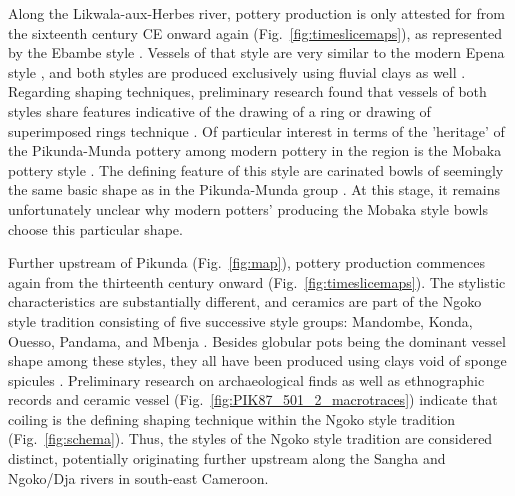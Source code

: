 \documentclass[smallextended,natbib]{svjour3}       %
\begin{document}
Along the Likwala-aux-Herbes river, pottery production is only attested for from the sixteenth century CE onward again (Fig.~\ref{fig:timeslicemaps}), as represented by the Ebambe style \citep[Fig.~\ref{fig:sangahtypes}.22--23;][131--136]{Seidensticker.2021e}. Vessels of that style are very similar to the modern Epena style \citep[Fig.~\ref{fig:sangahtypes}.25--26;][137--141]{Seidensticker.2021e}, and both styles are produced exclusively using fluvial clays as well \citep{Seidensticker.2020}. Regarding shaping techniques, preliminary research found that vessels of both styles share features indicative of the drawing of a ring or drawing of superimposed rings technique \citep[Fig.~\ref{fig:schema};][55--57 Fig.~17--18]{Seidensticker.2021e}. Of particular interest in terms of the 'heritage' of the Pikunda-Munda pottery among modern pottery in the region is the Mobaka pottery style \citep[141--144]{Seidensticker.2021e}. The defining feature of this style are carinated bowls of seemingly the same basic shape as in the Pikunda-Munda group \citep[Fig.~\ref{fig:sangahtypes}.24;][142 Fig.~63.1,64]{Seidensticker.2021e}. At this stage, it remains unfortunately unclear why modern potters' producing the Mobaka style bowls choose this particular shape.

Further upstream of Pikunda (Fig.~\ref{fig:map}), pottery production commences again from the thirteenth century onward (Fig.~\ref{fig:timeslicemaps}). The stylistic characteristics are substantially different, and ceramics are part of the Ngoko style tradition consisting of five successive style groups: Mandombe, Konda, Ouesso, Pandama, and Mbenja \citep[Fig.~\ref{fig:sangahtypes}.13--21;][145--162]{Seidensticker.2021e}. Besides globular pots being the dominant vessel shape among these styles, they all have been produced using clays void of sponge spicules \citep[Fig.~\ref{fig:thinsections}.J--K;][]{Seidensticker.2020}. Preliminary research on archaeological finds \citep[Fig.~\ref{fig:PIK87_1-2_3_macrotraces}--\ref{fig:PIK87_1_macrotraces};][53--54 Fig.~16B]{Seidensticker.2021e} as well as ethnographic records and ceramic vessel (Fig.~\ref{fig:PIK87_501_2_macrotraces}) indicate that coiling is the defining shaping technique within the Ngoko style tradition (Fig.~\ref{fig:schema}). Thus, the styles of the Ngoko style tradition are considered distinct, potentially originating further upstream along the Sangha and Ngoko/Dja rivers in south-east Cameroon. 

\end{document}
